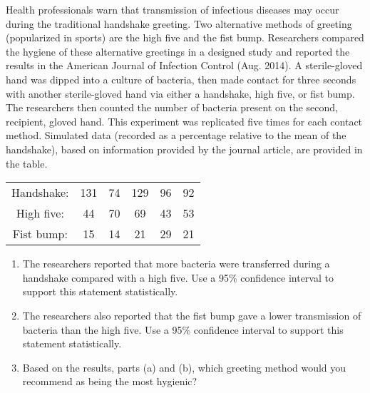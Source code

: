
\begin{exercise}

    Health professionals warn that transmission of infectious diseases may occur during the
    traditional handshake greeting. Two alternative methods of greeting (popularized in sports)
    are the high five and the fist bump. Researchers compared the hygiene of these alternative
    greetings in a designed study and reported the results in the American Journal of Infection
    Control (Aug. 2014). A sterile-gloved hand was dipped into a culture of bacteria, then made
    contact for three seconds with another sterile-gloved hand via either a handshake, high five,
    or fist bump. The researchers then counted the number of bacteria present on the second,
    recipient, gloved hand. This experiment was replicated five times for each contact method.
    Simulated data (recorded as a percentage relative to the mean of the handshake), based on
    information provided by the journal article, are provided in the table.

    \begin{center}
        \begin{tabular}{c c c c c c}
            Handshake: & 131 & 74 & 129 & 96 & 92 \\
            High five: & 44 & 70 & 69 & 43 & 53 \\
            Fist bump: & 15 & 14 & 21 & 29 & 21
        \end{tabular}
    \end{center}


    \begin{enumerate}[label = (\alph*)]
        \item The researchers reported that more bacteria were transferred
        during a handshake compared with a high five. Use a 95\% confidence interval to support this statement statistically.
        \item The researchers also reported that the fist bump gave a lower transmission
        of bacteria than the high five. Use a 95\% confidence interval to support this statement statistically.
        \item Based on the results, parts (a) and (b), which greeting method would you
        recommend as being the most hygienic?
    \end{enumerate}

\end{exercise}

